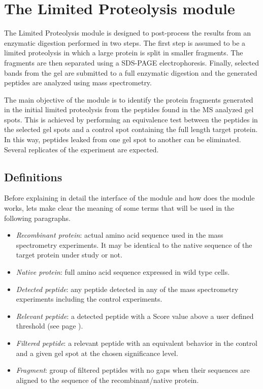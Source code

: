 \chapter{The Limited Proteolysis module}
\label{chap:limprot}

The Limited Proteolysis module is designed to post-process the results from an enzymatic digestion performed in two steps. The first step is assumed to be a limited proteolysis in which a large protein is split in smaller fragments. The fragments are then separated using a SDS-PAGE electrophoresis. Finally, selected bands from the gel are submitted to a full enzymatic digestion and the generated peptides are analyzed using mass spectrometry.

The main objective of the module is to identify the protein fragments generated in the initial limited proteolysis from the peptides found in the MS analyzed gel spots. This is achieved by performing an equivalence test\cite{Limentani2005} between the peptides in the selected gel spots and a control spot containing the full length target protein. In this way, peptides leaked from one gel spot to another can be eliminated. Several replicates of the experiment are expected.

\section{Definitions}
\label{sec:limprotDefinitions}

Before explaining in detail the interface of the module and how does the module works, lets make clear the meaning of some terms that will be used in the following paragraphs.

\begin{itemize}
	\item \textit{Recombinant protein}: actual amino acid sequence used in the mass spectrometry experiments. It may be identical to the native sequence of the target protein under study or not.
	\item \textit{Native protein}: full amino acid sequence expressed in wild type cells.
	\item \textit{Detected peptide}: any peptide detected in any of the mass spectrometry experiments including the control experiments.
	\item \textit{Relevant peptide}: a detected peptide with a Score value above a user defined threshold (see page \pageref{par:limprotScoreValue}).
	\item \textit{Filtered peptide}: a relevant peptide with an equivalent behavior in the control and a given gel spot at the chosen significance level.\label{par:limprotFP}
	\item \textit{Fragment}: group of filtered peptides with no gaps when their sequences are aligned to the sequence of the recombinant/native protein. 
\end{itemize}

